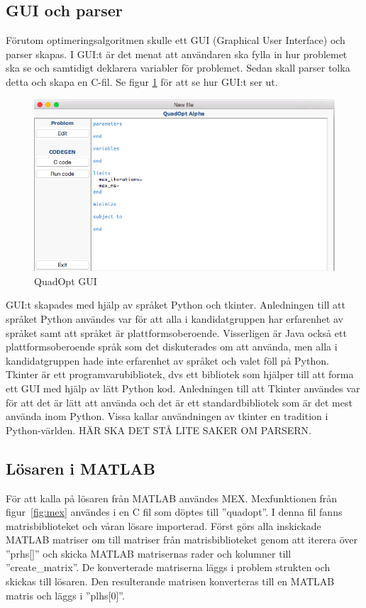 \subsection{GUI och parser}
Förutom optimeringsalgoritmen skulle ett GUI (Graphical User Interface) och parser skapas. I GUI:t är det menat att användaren ska fylla in hur problemet ska se och samtidigt deklarera variabler för problemet. Sedan skall parser tolka detta och skapa en C-fil. Se figur \ref{fig:quadoptgui} för att se hur GUI:t ser ut.
\begin{figure}
\centerline{\includegraphics[scale=0.58]{grafik/QuadOptGUI}}
\caption{QuadOpt GUI}
\label{fig:quadoptgui}
\end{figure}
GUI:t skapades med hjälp av språket Python och tkinter. Anledningen till att språket Python användes var för att alla i kandidatgruppen har erfarenhet av språket samt att språket är plattformsoberoende. Visserligen är Java också ett plattformsoberoende språk som det diskuterades om att använda, men alla i kandidatgruppen hade inte erfarenhet av språket och valet föll på Python.
\newline
\newline
Tkinter är ett programvarubibliotek, dvs ett bibliotek som hjälper till att forma ett GUI med hjälp av lätt Python kod. Anledningen till att Tkinter användes var för att det är lätt att använda och det är ett standardbibliotek som är det mest använda inom Python. Vissa kallar användningen av tkinter en tradition i Python-världen.
\newline
\newline
HÄR SKA DET STÅ LITE SAKER OM PARSERN. 

\subsection{Lösaren i MATLAB}
För att kalla på lösaren från MATLAB användes MEX. Mexfunktionen från figur~\ref{fig:mex} användes i en C fil som döptes till ''quadopt''. I denna fil fanns matrisbiblioteket och våran lösare importerad. Först görs alla inskickade MATLAB matriser om till matriser från matrisbiblioteket genom att iterera över ''prhs[]'' och skicka MATLAB matrisernas rader och kolumner till ''create\_matrix''. De konverterade matriserna läggs i problem strukten och skickas till lösaren. Den resulterande matrisen konverteras till en MATLAB matris och läggs i ''plhs[0]''.

